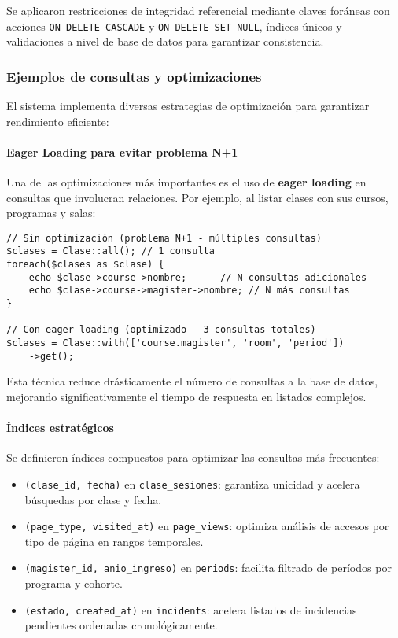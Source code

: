 Se aplicaron restricciones de integridad referencial mediante claves foráneas con acciones \texttt{ON DELETE CASCADE} y \texttt{ON DELETE SET NULL}, índices únicos y validaciones a nivel de base de datos para garantizar consistencia.

\subsubsection{Ejemplos de consultas y optimizaciones}

El sistema implementa diversas estrategias de optimización para garantizar rendimiento eficiente:

\paragraph{Eager Loading para evitar problema N+1}

Una de las optimizaciones más importantes es el uso de \textbf{eager loading} en consultas que involucran relaciones. Por ejemplo, al listar clases con sus cursos, programas y salas:

\begin{verbatim}
// Sin optimización (problema N+1 - múltiples consultas)
$clases = Clase::all(); // 1 consulta
foreach($clases as $clase) {
    echo $clase->course->nombre;      // N consultas adicionales
    echo $clase->course->magister->nombre; // N más consultas
}

// Con eager loading (optimizado - 3 consultas totales)
$clases = Clase::with(['course.magister', 'room', 'period'])
    ->get();
\end{verbatim}

Esta técnica reduce drásticamente el número de consultas a la base de datos, mejorando significativamente el tiempo de respuesta en listados complejos.

\paragraph{Índices estratégicos}

Se definieron índices compuestos para optimizar las consultas más frecuentes:

\begin{itemize}
    \item \texttt{(clase\_id, fecha)} en \texttt{clase\_sesiones}: garantiza unicidad y acelera búsquedas por clase y fecha.
    \item \texttt{(page\_type, visited\_at)} en \texttt{page\_views}: optimiza análisis de accesos por tipo de página en rangos temporales.
    \item \texttt{(magister\_id, anio\_ingreso)} en \texttt{periods}: facilita filtrado de períodos por programa y cohorte.
    \item \texttt{(estado, created\_at)} en \texttt{incidents}: acelera listados de incidencias pendientes ordenadas cronológicamente.
\end{itemize}


